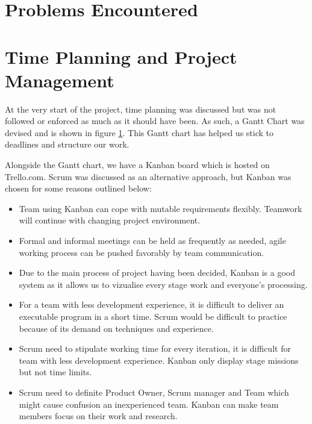 \documentclass[titlepage]{article}
\begin{document}
\section{Problems Encountered}

\section{Time Planning and Project Management}
At the very start of the project, time planning was discussed but was not followed or enforced as much as it should have been. As such, a Gantt Chart was devised and is shown in figure \ref{ganttchart}. This Gantt chart has helped us stick to deadlines and structure our work.

\begin{figure}\label{ganttchart}
  
\end{figure}

Alongside the Gantt chart, we have a Kanban board which is hosted on Trello.com. Scrum was discussed as an alternative approach, but Kanban was chosen for some reasons outlined below:

\begin{itemize}
\item Team using Kanban can cope with mutable requirements flexibly. Teamwork will continue with changing project environment.
\item Formal and informal meetings can be held as frequently as needed, agile working process can be pushed favorably by team communication.
\item Due to the main process of project having been decided, Kanban is a good system as it allows us to vizualise every stage work and everyone’s processing.
\item For a team with less development experience, it is difficult to deliver an executable program in a short time. Scrum would be difficult to practice because of its demand on techniques and experience.
\item Scrum need to stipulate working time for every iteration, it is difficult for
team with less development experience. Kanban only display stage
missions but not time limits.
\item Scrum need to definite Product Owner, Scrum manager and Team which might cause confusion an inexperienced team. Kanban can make team members focus on their work and research.
\end{itemize}

\pagebreak
{}
 
\end{document}
